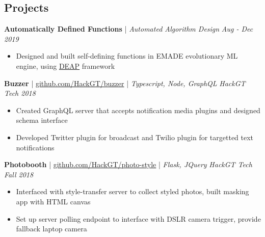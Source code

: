 \subsection*{Projects}
\headerrow
    {\textbf{Automatically Defined Functions} | \textit{Automated Algorithm Design}}
    {\emph{Aug - Dec 2019}}
\begin{itemize}
    \item Designed and built self-defining functions in EMADE evolutionary ML engine, using \href{https://github.com/DEAP/deap}{DEAP} framework
\end{itemize}
\iftoggle{dense}{}{
    \headerrow
        {\textbf{Filter Inverter} | \href{https://team-vision2020.github.io}{team-vision2020.github.io}}
        {\emph{Oct - Nov 2018}}
    \begin{itemize}
        \item Unfilter Instagram filters using detection and pseudo-inversion. Created demo combining all models
        \item Designed voting procedure that used nearest neighbor classifier on generated knowledge base
    \end{itemize}
}
\headerrow
    {\textbf{Buzzer} | \href{https://github.com/HackGT/buzzer}{github.com/HackGT/buzzer} |
    \textit{Typescript, Node, GraphQL}}
    {\emph{HackGT Tech 2018}}
\begin{itemize}
    \item Created GraphQL server that accepts notification media plugins and designed schema interface
    \item Developed Twitter plugin for broadcast and Twilio plugin for targetted text notifications
\end{itemize}
\headerrow
    {\textbf{Photobooth} | \href{https://github.com/HackGT/photo-style}{github.com/HackGT/photo-style} |
    \textit{Flask, JQuery}}
    {\emph{HackGT Tech Fall 2018}}
\begin{itemize}
    \item Interfaced with style-transfer server to collect styled photos, built masking app with HTML canvas
    \item Set up server polling endpoint to interface with DSLR camera trigger, provide fallback laptop camera
\end{itemize}

